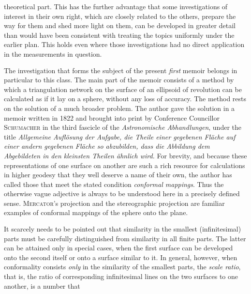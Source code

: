%
theoretical part. This has the further advantage that some investigations of interest in their own right, which are closely related to the others, prepare the way for them and shed more light on them, can be developed in greater detail than would have been consistent with treating the topics uniformly under the earlier plan. This holds even where those investigations had no direct application in the measurements in question.

The investigation that forms the subject of the present \textit{first} memoir belongs in particular to this class. The main part of the memoir consists of a method by which a triangulation network on the surface of an ellipsoid of revolution can be calculated as if it lay on a sphere, without any loss of accuracy. The method rests on the solution of a much broader problem. The author gave the solution in a memoir written in 1822 and brought into print by Conference Councillor \textsc{Schumacher} in the third fascicle of the \textit{Astronomische Abhandlungen}, under the title \textit{Allgemeine Auflösung der Aufgabe, die Theile einer gegebenen Fläche auf einer andern gegebenen Fläche so abzubilden, dass die Abbildung dem Abgebildeten in den kleinsten Theilen ähnlich wird.} For brevity, and because these representations of one surface on another are such a rich resource for calculations in higher geodesy that they well deserve a name of their own, the author has called those that meet the stated condition \textit{conformal mappings}. Thus the otherwise vague adjective is always to be understood here in a precisely defined sense. \textsc{Mercator}'s projection and the stereographic projection are familiar examples of conformal mappings of the sphere onto the plane.

It scarcely needs to be pointed out that similarity in the smallest (infinitesimal) parts must be carefully distinguished from similarity in all finite parts. The latter can be attained only in special cases, when the first surface can be developed onto the second itself or onto a surface similar to it. In general, however, when conformality consists \textit{only} in the similarity of the smallest parts, the \textit{scale ratio}, that is, the ratio of corresponding infinitesimal lines on the two surfaces to one another, is a number that %
